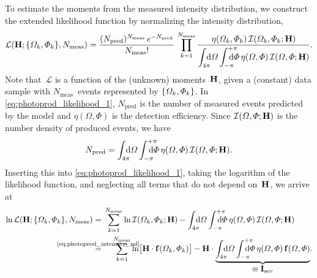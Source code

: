 To estimate the moments from the measured intensity distribution, we
construct the extended likelihood function by normalizing the
intensity distribution, \ie
\begin{equation}
  \label{eq:photoprod_likelihood_1}
  \mathcal{L}(\vect{H}; \set{\Omega_k, \Phi_k}, N_\text{meas})
  = \frac{(N_\text{pred})^{N_\text{meas}}\, e^{-N_\text{pred}}}{N_\text{meas}!}\,
  \prod_{k = 1}^{N_\text{meas}}
  \frac{\eta(\Omega_k, \Phi_k)\, \intensity(\Omega_k, \Phi_k; \vect{H})}%
  {\dint_{4 \pi}\!\!\!\! \dif{\Omega} \dint_{-\pi}^{+\pi}\hspace{-1.2em} \dif{\Phi}\, \eta(\Omega, \Phi)\, \intensity(\Omega, \Phi; \vect{H})}.
\end{equation}
Note that~$\mathcal{L}$ is a function of the (unknown)
moments~$\bm{\mathrm{H}}$, given a (constant) data sample with
$N_\text{meas}$~events represented by $\{{\Omega_k, \Phi_k}\}$.  In
\cref{eq:photoprod_likelihood_1}, $N_\text{pred}$ is the number of
measured events predicted by the model and $\eta(\Omega, \Phi)$ is the
detection efficiency.  Since $\mathcal{I}(\Omega, \Phi; \bm{\mathrm{H}})$ is
the number density of produced events, we have
\begin{equation}
  \label{eq:photoprod_Npred}
  N_\text{pred}
  = \int_{4 \pi}\!\!\!\! \dif{\Omega} \int_{-\pi}^{+\pi}\hspace{-1.2em} \dif{\Phi}\, \eta(\Omega, \Phi)\, \intensity(\Omega, \Phi; \vect{H}).
\end{equation}
Inserting this into
\cref{eq:photoprod_likelihood_1}, taking the logarithm of the
likelihood function, and neglecting all terms that do not depend
on~$\bm{\mathrm{H}}$, we arrive at
\begin{align}
  \ln \mathcal{L}(\vect{H}; \set{\Omega_k, \Phi_k}, N_\text{meas})
  ={}& \sum_{k = 1}^{N_\text{meas}} \ln \intensity(\Omega_k, \Phi_k; \vect{H})
  - \int_{4 \pi}\!\!\!\! \dif{\Omega} \int_{-\pi}^{+\pi}\hspace{-1.2em} \dif{\Phi}\, \eta(\Omega, \Phi)\, \intensity(\Omega, \Phi; \vect{H})
  \nonumber \\
  \label{eq:photoprod_likelihood_2}
  \cequalUsing{\cref{eq:photoprod_intensity_ml}}{}&\quad
  \sum_{k = 1}^{N_\text{meas}} \ln\!\sBrk[1]{\vect{H} \cdot \vect{f}(\Omega_k, \Phi_k)}
  - \vect{H} \cdot \dUnderbrace{\int_{4 \pi}\!\!\!\! \dif{\Omega} \int_{-\pi}^{+\pi}\hspace{-1.2em} \dif{\Phi}\, \eta(\Omega, \Phi)\, \vect{f}(\Omega, \Phi)}%
                               {\equiv \vect{I}_\text{acc}}.
\end{align}
